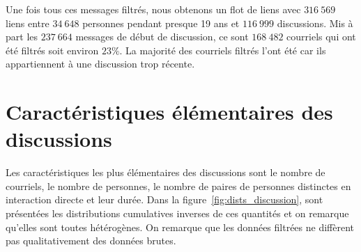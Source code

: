 Une fois tous ces messages filtrés, nous obtenons un flot de liens avec $316\ 569$ liens entre $34\ 648$ personnes pendant presque 19 ans et $116\ 999$ discussions.
Mis à part les $237\ 664$ messages de début de discussion, ce sont $168\ 482$ courriels qui ont été filtrés soit environ $23\%$.
La majorité des courriels filtrés l'ont été car ils appartiennent à une discussion trop récente.

\section{Caractéristiques élémentaires des discussions}

Les caractéristiques les plus élémentaires des discussions sont le nombre de courriels, le nombre de personnes, le nombre de paires de personnes distinctes en interaction directe et leur durée.
Dans la figure~\ref{fig:dists_discussion}, sont présentées les distributions cumulatives inverses de ces quantités et on remarque qu'elles sont toutes hétérogènes.
On remarque que les données filtrées ne diffèrent pas qualitativement des données brutes.

